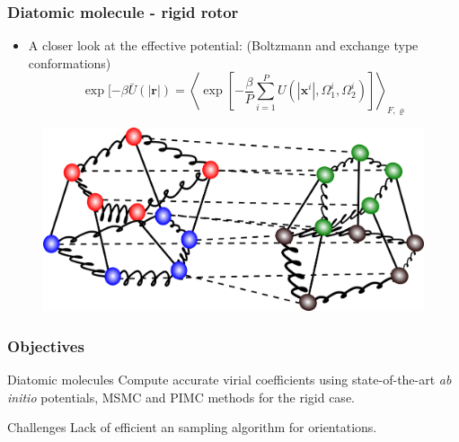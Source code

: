 \documentclass[xcolor=svgnames]{beamer}
\DeclareRobustCommand{\abinitio}[0]{\emph{ab initio}}
\DeclareRobustCommand{\mbf}[1]{{\boldsymbol {#1}}}
\begin{document}
        \begin{frame}
            \frametitle{Diatomic molecule - rigid rotor}
            \begin{itemize}
                \justifying
            \item A closer look at the effective potential: (Boltzmann and exchange type conformations)
                \begin{equation*}
                    \exp [-\beta \bar{U} (|\mbf{r}|) = \left< \exp \left[ -\frac{\beta}{P} \sum_{i=1}^P U (|\mbf{x}^i|,\Omega_1^i,\Omega_2^i) \right] \right>_{F,\varrho}
                \end{equation*}
            \end{itemize}
            \begin{figure}
            \centering
            \includegraphics[scale=0.3,keepaspectratio]{5beadsDimerVariableOrientation.png}
            \end{figure}

        \end{frame}
        \begin{frame}
            \frametitle{Objectives}
            \begin{block}{Diatomic molecules}
                Compute accurate virial coefficients using state-of-the-art \abinitio{} potentials, MSMC and PIMC methods for the rigid case.
            \end{block}
            \begin{alertblock}{Challenges}
                Lack of efficient an sampling algorithm for orientations.
            \end{alertblock}
        \end{frame}
\end{document}
